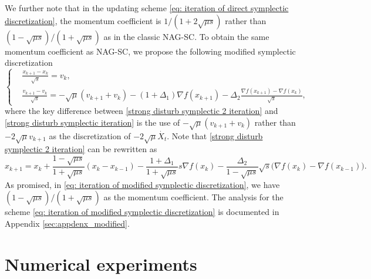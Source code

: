 \documentclass[11pt]{article}
\newcommand{\1}{\mathbf 1}
\numberwithin{equation}{section}
\begin{document}
We further note that in the updating scheme \eqref{eq: iteration of direct symplectic discretization}, the momentum coefficient is 
$1/(1+2\sqrt{\mu s})$ rather than  $(1-\sqrt{\mu s})/(1+\sqrt{\mu s})$ as in the classic NAG-SC. To obtain the same momentum coefficient as NAG-SC, we propose the following modified symplectic discretization 
\begin{equation}
    \label{strong disturb symplectic 2 iteration}
    \left\{
    \begin{aligned}
        &\frac{x_{k+1}-x_k}{\sqrt{s}}=v_k,\\
        &\frac{v_{k+1}-v_k}{\sqrt{s}}=-\sqrt{\mu}(v_{k+1}+v_k)-(1+\Delta_1)\nabla f(x_{k+1})-\Delta_2\frac{\nabla f(x_{k+1})-\nabla f(x_k)}{\sqrt{s}},
    \end{aligned}
    \right.
\end{equation}
where the key difference between \eqref{strong disturb symplectic 2 iteration} and \eqref{strong disturb symplectic iteration} is the use of $-\sqrt{\mu}(v_{k+1}+v_k)$ rather than $-2\sqrt{\mu}v_{k+1}$ as the discretization of $-2\sqrt{\mu}\dot{X_t}$.
Note that \eqref{strong disturb symplectic 2 iteration} can be rewritten as
\begin{equation}
    \label{eq: iteration of modified symplectic discretization}
    x_{k+1}=x_k+\frac{1-\sqrt{\mu s}}{1+\sqrt{\mu s}}(x_k-x_{k-1})-\frac{1+\Delta_1}{1+\sqrt{\mu s}}s\nabla f(x_{k})-\frac{\Delta_2}{1-\sqrt{\mu s}}\sqrt{s}\big(\nabla f(x_{k})-\nabla f(x_{k-1})\big).
\end{equation}
As promised, in \eqref{eq: iteration of modified symplectic discretization}, we have $(1-\sqrt{\mu s})/(1+\sqrt{\mu s})$ as the momentum coefficient. The analysis for the scheme \eqref{eq: iteration of modified symplectic discretization} is documented in Appendix \ref{sec:appdenx_modified}.










\section{Numerical experiments}
\label{sec: numerical experiments}
\end{document}
